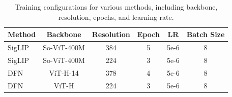 
\begin{table}
\centering
\footnotesize
\setlength{\tabcolsep}{5pt} %
\begin{tabular}{lccccc}
\toprule
{Method} & {Backbone} & {Resolution} & {Epoch} & {LR} &{Batch Size} \\
\midrule
SigLIP \cite{zhai2023sigmoid} & So-ViT-400M & 384 & 5 & 5e-6& 8 \\ 
SigLIP \cite{zhai2023sigmoid} & So-ViT-400M & 224 & 3 & 5e-6&8 \\
DFN \cite{fang2023data} & ViT-H-14 & 378 & 4 & 5e-6&8 \\ 
DFN \cite{fang2023data} & ViT-H & 224 & 3 & 5e-6&8 \\ 
\bottomrule
\end{tabular}

\caption{Training configurations for various methods, including backbone, resolution, epochs, and learning rate.}
\label{tab:training_config}
\end{table}

